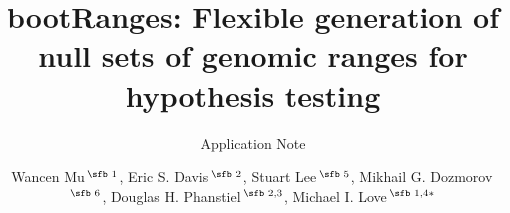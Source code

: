 \documentclass{bioinfo}
\begin{document}

\subtitle{Application Note}

\title[short Title]{bootRanges: Flexible generation of null sets of genomic ranges for hypothesis testing}
\author[Sample \textit{et~al}.]{Wancen Mu\,$^{\text{\sfb 1}}$, Eric S. Davis\,$^{\text{\sfb 2}}$, Stuart Lee\,$^{\text{\sfb 5}}$, Mikhail G. Dozmorov\,$^{\text{\sfb 6}}$, Douglas H. Phanstiel\,$^{\text{\sfb 2,3}}$, Michael I. Love\,$^{\text{\sfb 1,4}*}$}
\address{$^{\text{\sf 1}}$Department of Biostatistics, $^{\text{\sf 2}}$Curriculum in Bioinformatics and Computational Biology, $^{\text{\sf 3}}$Thurston Arthritis Research Center, Department of Cell Biology \& Physiology, Lineberger Comprehensive Cancer Center, Curriculum in Genetics \& Molecular Biology, and $^{\text{\sf 4}}$ Department of Genetics, University of North Carolina-Chapel Hill, NC 27599
$^{\text{\sf 5}}$Genentech, South San Francisco, CA, USA $^{\text{\sf 6}}$Department of Biostatistics, Department of Pathology, Virginia Commonwealth University, Richmond, VA 23298.\\}





\maketitle
{}





%
%
%
%
%
%
%

\end{document}
